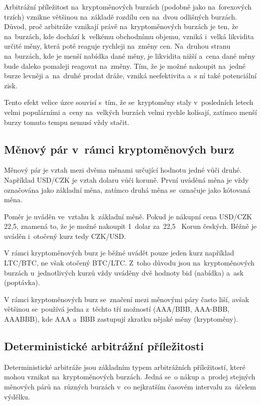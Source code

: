 \documentclass[thesis=B,czech]{FITthesis}[2019/03/21]
\begin{document}
Arbitrážní příležitost na~kryptoměnových burzách (podobně jako na~forexových trzích) vznikne většinou na~základě rozdílu cen na~dvou odlišných burzách. Důvod, proč arbitráže vznikají právě na~kryptoměnových burzách je ten, že na~burzách, kde dochází k~velkému obchodnímu objemu, vzniká i~velká likvidita určité měny, která poté reaguje rychleji na~změny cen. Na~druhou stranu na~burzách, kde je menší nabídka dané měny, je likvidita nižší a~cena dané měny bude daleko pomaleji reagovat na~změny. Tím, že je možné nakoupit na~jedné burze levněji a~na~druhé prodat dráže, vzniká neefektivita a~s ní také potenciální zisk.

Tento efekt velice úzce souvisí s~tím, že se~kryptoměny staly v~posledních letech velmi populárními a~ceny na~velkých burzách velmi rychle kolísají, zatímco menší burzy tomuto tempu nemusí vždy stačit. \cite{finder}

\subsection{Měnový pár v~rámci kryptoměnových burz}
Měnový pár je vztah mezi dvěma měnami určující hodnotu jedné vůči druhé. Například USD/CZK je vztah dolaru vůči koruně. První uváděná měna je vždy označována jako základní měna, zatímco druhá měna se~označuje jako kótovaná měna. \cite{Capital_menovy_par} 

Poměr je uváděn ve~vztahu k~základní měně. Pokud je nákupní cena USD/CZK 22,5, znamená to, že je možné nakoupit 1~dolar za~22,5~ Korun českých. Běžně je uváděn i~otočený kurz tedy CZK/USD. \cite{Capital_menovy_par} 

V rámci kryptoměnových burz je běžné uvádět pouze jeden kurz například LTC/BTC, ne však otočený BTC/LTC. Z~toho důvodu jsou \linebreak na~kryptoměnových burzách u~jednotlivých kurzů vždy uváděny dvě hodnoty bid (nabídka) a~ask (poptávka). 

V rámci kryptoměnových burz se~značení mezi měnovými páry často liší, avšak většinou se~používá jedna z~těchto tří možností (AAA/BBB, AAA-BBB, AAABBB), kde AAA a~BBB zastupují zkratku nějaké měny (kryptoměny).

\subsection{Deterministické arbitrážní příležitosti}
Deterministické arbitráže jsou základním typem arbitrážních příležitostí, které mohou vznikat na~kryptoměnových burzách. Jedná se~o nákup a~prodej \linebreak stejných měnových párů na~různých burzách v~co nejkratším časovém intervalu za~účelem výdělku. \cite{CZInvestor} \cite{TowardsDataScience}
\end{document}
